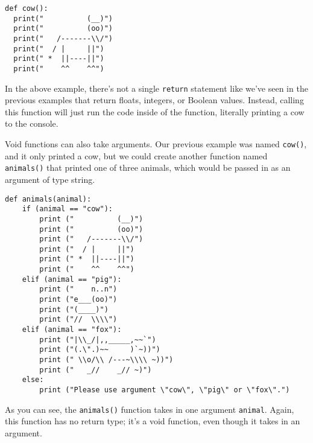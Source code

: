 \begin{lstlisting}[style=pippython]
def cow():
  print("          (__)")
  print("          (oo)")
  print("   /-------\\/")
  print("  / |     ||")
  print(" *  ||----||")
  print("    ^^    ^^")
\end{lstlisting}
In the above example, there's not a single \verb|return| statement like we've seen in the previous examples that return floats, integers, or Boolean values. Instead, calling this function will just run the code inside of the function, literally printing a cow to the console.\par
Void functions can also take arguments. Our previous example was named \verb|cow()|, and it only printed a cow, but we could create another function named \verb|animals()| that printed one of three animals, which would be passed in as an argument of type string.\par
\begin{lstlisting}[style=pippython]
def animals(animal):
    if (animal == "cow"):
        print ("          (__)")
        print ("          (oo)")
        print ("   /-------\\/")
        print ("  / |     ||")
        print (" *  ||----||")
        print ("    ^^    ^^")
    elif (animal == "pig"):
        print ("    n..n")
        print ("e___(oo)")
        print ("(____)")
        print ("//  \\\\")
    elif (animal == "fox"):
        print ("|\\_/|,,_____,~~`")
        print ("(.\".)~~     )`~))")
        print (" \\o/\\ /---~\\\\ ~))")
        print ("   _//    _// ~)")
    else:
        print ("Please use argument \"cow\", \"pig\" or \"fox\".")
\end{lstlisting}
As you can see, the \verb|animals()| function takes in one argument \verb|animal|. Again, this function has no return type; it's a void function, even though it takes in an argument.\par
